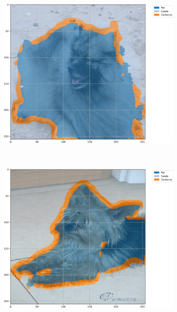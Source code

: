 \begin{figure}[H]
    \centering
    \caption{Exemplos segmentados a partir de U-Net com BPCAPooling e 500 épocas no conjunto de dados \textit{Oxford-IIIT Pets} baseada em acurácia.}
    \label{results:fig:semantic:5}
     \begin{subfigure}[t]{0.32\textwidth}
         \centering
         \includegraphics[width=1\linewidth]{recursos/imagens/results/bpca_acc_unet500_image_0_overlayed_segmentation.png}
         \label{results:fig:semantic:5.1}
     \end{subfigure}%
     ~ 
     \begin{subfigure}[t]{0.32\textwidth}
         \centering
         \includegraphics[width=1\linewidth]{recursos/imagens/results/bpca_acc_unet500_image_1_overlayed_segmentation.png}

\end{subfigure}
\end{figure}
